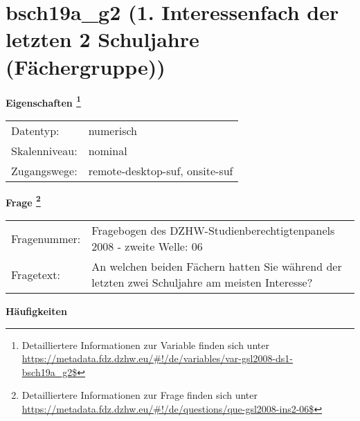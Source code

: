 
    \setcounter{footnote}{0}

    \vspace*{-1.8cm}
	\section{bsch19a\_g2 (1. Interessenfach der letzten 2 Schuljahre (Fächergruppe))}
	\label{section:bsch19a_g2}



    \vspace*{0.5cm}
    \noindent\textbf{Eigenschaften
	\footnote{Detailliertere Informationen zur Variable finden sich unter
		\url{https://metadata.fdz.dzhw.eu/\#!/de/variables/var-gsl2008-ds1-bsch19a_g2$}}}\\
	\begin{tabularx}{\hsize}{@{}lX}
	Datentyp: & numerisch \\
	Skalenniveau: & nominal \\
	Zugangswege: &
	  remote-desktop-suf, 
	  onsite-suf
 \\
    \end{tabularx}



				\vspace*{0.5cm}
                \noindent\textbf{Frage
	                \footnote{Detailliertere Informationen zur Frage finden sich unter
		              \url{https://metadata.fdz.dzhw.eu/\#!/de/questions/que-gsl2008-ins2-06$}}}\\
				\begin{tabularx}{\hsize}{@{}lX}
					Fragenummer: &
					  Fragebogen des DZHW-Studienberechtigtenpanels 2008 - zweite Welle:
					  06
 \\
					Fragetext: & An welchen beiden Fächern hatten Sie während der letzten zwei Schuljahre am meisten Interesse? \\
				\end{tabularx}





        		\vspace*{0.5cm}
                \noindent\textbf{Häufigkeiten}

